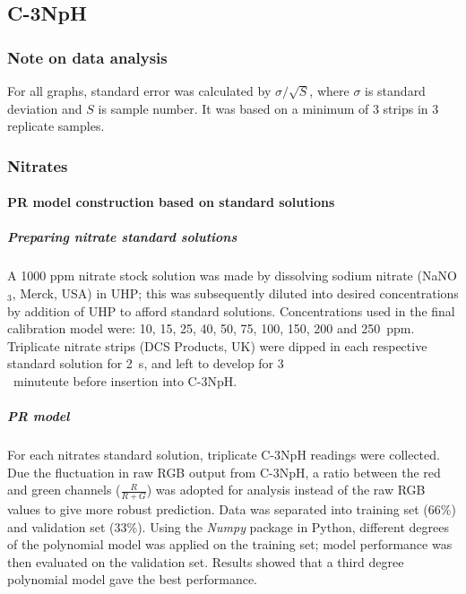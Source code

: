 \tocless \subsection{C-3NpH} 
\label{C3nph_meth}



\subsubsection{Note on data analysis}
For all graphs, standard error was calculated by $\sigma/\sqrt{S}$, where $\sigma$ is standard deviation and $S$ is sample number. It was based on a minimum of 3 strips in 3 replicate samples. 

\subsubsection{Nitrates} \label{Nitrateproto}

\paragraph{\gls{PR} model construction based on standard solutions} 
\subparagraph{Preparing nitrate standard solutions}
\noindent A 1000 ppm nitrate stock solution was made by dissolving %
sodium nitrate (NaNO$_3$, Merck, USA) in %
\acrshort{UHP}; this was subsequently diluted into desired concentrations by addition of %
\acrshort{UHP} to %
afford standard solutions. Concentrations used in the final calibration model were: 10, 15, 25, 40, 50, 75, 100, 150, 200 and \SI{250}{ppm}. Triplicate nitrate strips (DCS Products, UK) were dipped in each respective standard solution for \SI{2}{s}, and left to develop for \SI{3}{\\minuteute} before insertion into C-3NpH. %
\subparagraph{PR model} \label{ratio}
\noindent For each nitrates standard solution, triplicate C-3NpH readings were collected. Due the fluctuation in raw RGB output from C-3NpH, a ratio between the red and green channels ($\frac{R}{R+G}$) was adopted for analysis instead of the raw RGB values to give more robust prediction. %
Data was separated into training set (66\%) and validation set (33\%). Using the \textit{Numpy} package in Python, different degrees of the polynomial model was applied on the training set; model performance was then evaluated on the validation set. Results showed that a third degree polynomial model gave the best performance. 

